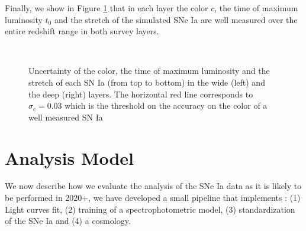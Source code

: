 \documentclass[\docopts]{\docclass}
\begin{document}
Finally, we show in Figure \ref{fig:sigmas} that in each layer the color $c$, the time of maximum luminosity $t_0$ and the stretch of the simulated SNe Ia are well measured over the entire redshift range in both survey layers.

\begin{figure}[t]
\begin{center}
\\
\caption{Uncertainty of the color, the time of maximum luminosity and the stretch of each SN Ia (from top to bottom) in the wide (left) and the deep (right) layers. The horizontal red line corresponds to $\sigma_c = 0.03$ which is the threshold on the accuracy on the color of a well measured SN Ia}
\label{fig:sigmas}
\end{center}
\end{figure}


\section{Analysis Model}
\label{sec::analysis_model}

We now describe how we evaluate the analysis of the SNe Ia data as it is likely to be performed in 2020+, we have developed a small pipeline that implements : (1) Light curves fit, (2) training of a spectrophotometric model, (3) standardization of the SNe Ia and (4) a cosmology. 
\end{document}
